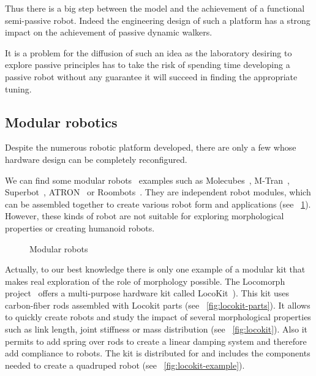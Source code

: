 Thus there is a big step between the model and the achievement of a functional semi-passive robot. Indeed the engineering design of such a platform has a strong impact on the achievement of passive dynamic walkers.

It is a problem for the diffusion of such an idea as the laboratory desiring to explore passive principles has to take the risk of spending time developing a passive robot without any guarantee it will succeed in finding the appropriate tuning.


\subsection{Modular robotics} %

Despite the numerous robotic platform developed, there are only a few whose hardware design can be completely reconfigured.

We can find some modular robots~\parencite{murata2007self} examples such as Molecubes~\parencite{zykov2007molecubes}, M-Tran~\parencite{murata2002m}, Superbot~\parencite{salemi2006superbot}, ATRON~\parencite{jorgensen2004modular} or Roombots~\parencite{sproewitz2009roombots}. They are independent robot modules, which can be assembled together to create various robot form and applications (see \figurename~\ref{fig:modular-robots}). However, these kinds of robot are not suitable for exploring morphological properties or creating humanoid robots.

\begin{figure}[tb]
\centering
    \hfil
    \caption{Modular robots}
    \label{fig:modular-robots}
\end{figure}

Actually, to our best knowledge there is only one example of a modular kit that makes real exploration of the role of morphology possible. The Locomorph project~\parencite{locomorph} offers a multi-purpose hardware kit called LocoKit~\parencite{larsen2012locokit}). This kit uses carbon-fiber rods assembled with Locokit parts (see \figurename~\ref{fig:locokit-parts}). It allows to quickly create robots and study the impact of several morphological properties such as link length, joint stiffness or mass distribution (see \figurename~\ref{fig:locokit}). Also it permits to add spring over rods to create a linear damping system and therefore add compliance to robots.
The kit is distributed for  and includes the components needed to create a quadruped robot (see \figurename~\ref{fig:locokit-example}).

